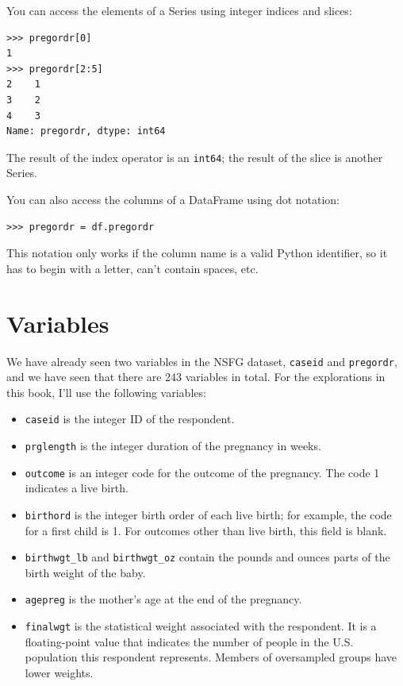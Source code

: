 \documentclass[12pt]{book}
\begin{document}
You can access the elements of a Series using integer indices
and slices:

\begin{verbatim}
>>> pregordr[0]
1
>>> pregordr[2:5]
2    1
3    2
4    3
Name: pregordr, dtype: int64
\end{verbatim}

The result of the index operator is an {\tt int64}; the
result of the slice is another Series.

You can also access the columns of a DataFrame using dot notation:

\begin{verbatim}
>>> pregordr = df.pregordr
\end{verbatim}

This notation only works if the column name is a valid Python
identifier, so it has to begin with a letter, can't contain spaces, etc.


\section{Variables}

We have already seen two variables in the NSFG dataset, {\tt caseid}
and {\tt pregordr}, and we have seen that there are 243 variables in
total.  For the explorations in this book, I'll use the following
variables:

\begin{itemize}

\item {\tt caseid} is the integer ID of the respondent.

\item {\tt prglength} is the integer duration of the pregnancy in weeks.

\item {\tt outcome} is an integer code for the outcome of the
  pregnancy.  The code 1 indicates a live birth.

\item {\tt birthord} is the integer birth order of each live birth;
  for example, the code for a first child is 1.  For outcomes other
  than live birth, this field is blank.

\item \verb"birthwgt_lb" and \verb"birthwgt_oz" contain the
pounds and ounces parts of the birth weight of the baby.

\item {\tt agepreg} is the mother's age at the end of the pregnancy.

\item {\tt finalwgt} is the statistical weight associated with the
  respondent.  It is a floating-point value that indicates the number
  of people in the U.S. population this respondent represents.
  Members of oversampled groups have lower
  weights.

\end{itemize}
\end{document}
